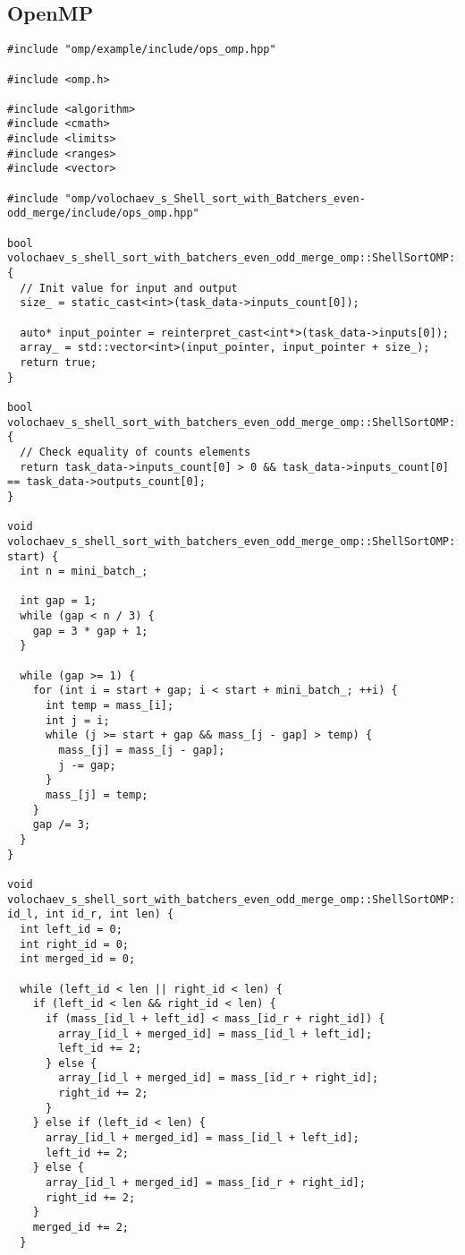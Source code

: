 \documentclass[12pt]{article}
\begin{document}
\subsection*{OpenMP}
\begin{lstlisting}
#include "omp/example/include/ops_omp.hpp"

#include <omp.h>

#include <algorithm>
#include <cmath>
#include <limits>
#include <ranges>
#include <vector>

#include "omp/volochaev_s_Shell_sort_with_Batchers_even-odd_merge/include/ops_omp.hpp"

bool volochaev_s_shell_sort_with_batchers_even_odd_merge_omp::ShellSortOMP::PreProcessingImpl() {
  // Init value for input and output
  size_ = static_cast<int>(task_data->inputs_count[0]);

  auto* input_pointer = reinterpret_cast<int*>(task_data->inputs[0]);
  array_ = std::vector<int>(input_pointer, input_pointer + size_);
  return true;
}

bool volochaev_s_shell_sort_with_batchers_even_odd_merge_omp::ShellSortOMP::ValidationImpl() {
  // Check equality of counts elements
  return task_data->inputs_count[0] > 0 && task_data->inputs_count[0] == task_data->outputs_count[0];
}

void volochaev_s_shell_sort_with_batchers_even_odd_merge_omp::ShellSortOMP::ShellSort(int start) {
  int n = mini_batch_;

  int gap = 1;
  while (gap < n / 3) {
    gap = 3 * gap + 1;
  }

  while (gap >= 1) {
    for (int i = start + gap; i < start + mini_batch_; ++i) {
      int temp = mass_[i];
      int j = i;
      while (j >= start + gap && mass_[j - gap] > temp) {
        mass_[j] = mass_[j - gap];
        j -= gap;
      }
      mass_[j] = temp;
    }
    gap /= 3;
  }
}

void volochaev_s_shell_sort_with_batchers_even_odd_merge_omp::ShellSortOMP::MergeBlocks(int id_l, int id_r, int len) {
  int left_id = 0;
  int right_id = 0;
  int merged_id = 0;

  while (left_id < len || right_id < len) {
    if (left_id < len && right_id < len) {
      if (mass_[id_l + left_id] < mass_[id_r + right_id]) {
        array_[id_l + merged_id] = mass_[id_l + left_id];
        left_id += 2;
      } else {
        array_[id_l + merged_id] = mass_[id_r + right_id];
        right_id += 2;
      }
    } else if (left_id < len) {
      array_[id_l + merged_id] = mass_[id_l + left_id];
      left_id += 2;
    } else {
      array_[id_l + merged_id] = mass_[id_r + right_id];
      right_id += 2;
    }
    merged_id += 2;
  }


\end{lstlisting}
\end{document}
